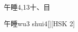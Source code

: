 \begin{entry}{午睡}{4,13}{⼗、⽬}
  \begin{phonetics}{午睡}{wu3 shui4}[][HSK 2]
  \end{phonetics}
\end{entry}
